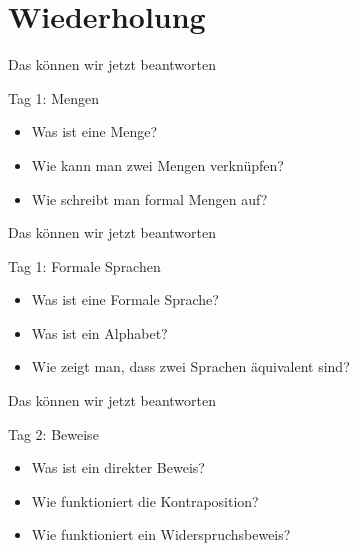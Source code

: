 


\section{Wiederholung}
\begin{frame}[fragile]{Das können wir jetzt beantworten}
    \begin{alertblock}{Tag 1: Mengen}
        \begin{itemize}
            \item Was ist eine Menge?
            \item Wie kann man zwei Mengen verknüpfen?
            \item Wie schreibt man formal Mengen auf?
        \end{itemize}
    \end{alertblock}
\end{frame}

\begin{frame}[fragile]{Das können wir jetzt beantworten}
    \begin{alertblock}{Tag 1: Formale Sprachen}
        \begin{itemize}
            \item Was ist eine Formale Sprache?
            \item Was ist ein Alphabet?
            \item Wie zeigt man, dass zwei Sprachen äquivalent sind?
        \end{itemize}
    \end{alertblock}
\end{frame}



\begin{frame}[fragile]{Das können wir jetzt beantworten}
    \begin{alertblock}{Tag 2: Beweise}
        \begin{itemize}
            \item Was ist ein direkter Beweis?
            \item Wie funktioniert die Kontraposition?
            \item Wie funktioniert ein Widerspruchsbeweis?
        \end{itemize}
    \end{alertblock}
\end{frame}

